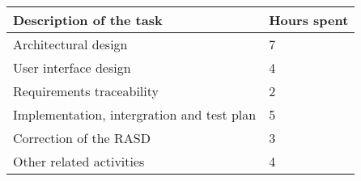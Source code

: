 \begin{itemize}
\begin{tabular}{| m{9cm} | m{3cm}| }
					\textbf{Description of the task} & \textbf{Hours spent}\\
				\hline
					Architectural design & 7 \\
				\hline
					User interface design & 4 \\
				\hline
					Requirements traceability & 2 \\
				\hline
					Implementation, intergration and test plan & 5 \\
				\hline
					Correction of the RASD & 3 \\
				\hline
					Other related activities & 4 \\
				\hline
				\end{tabular}
				\\\\\\
		\end{itemize}
